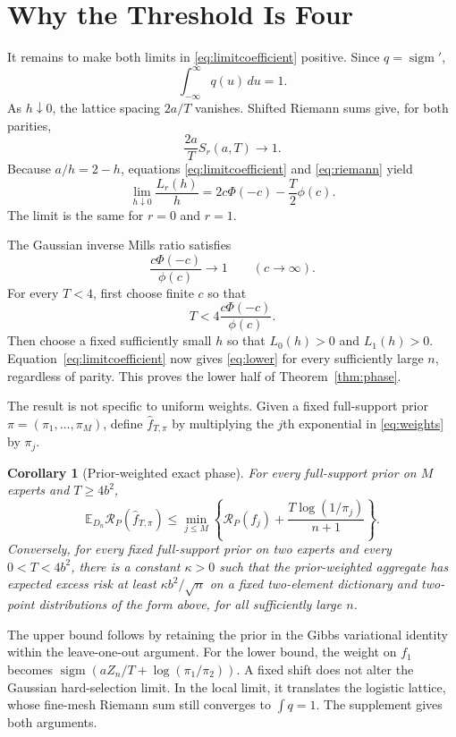 \documentclass[twoside]{article}
\newtheorem{corollary}[theorem]{Corollary}
\newcommand{\E}{\mathbb E}
\newcommand{\R}{\mathcal R}
\newcommand{\1}{\mathbf 1}
\newcommand{\sigm}{\operatorname{sigm}}
\begin{document}
\section{Why the Threshold Is Four}

It remains to make both limits in \eqref{eq:limitcoefficient} positive. Since $q=\sigm'$, \[ \int_{-\infty}^{\infty}q(u)\,du=1. \] As $h\downarrow0$, the lattice spacing $2a/T$ vanishes. Shifted Riemann sums give, for both parities,
\begin{equation}
\frac{2a}{T}S_r(a,T)\longrightarrow1.
\label{eq:riemann}
\end{equation}
Because $a/h=2-h$, equations \eqref{eq:limitcoefficient} and \eqref{eq:riemann} yield
\begin{equation}
\lim_{h\downarrow0}\frac{L_r(h)}h
=2c\Phi(-c)-\frac{T}{2}\phi(c).
\label{eq:coefficientlimit}
\end{equation}
The limit is the same for $r=0$ and $r=1$.

The Gaussian inverse Mills ratio satisfies
\begin{equation}
\frac{c\Phi(-c)}{\phi(c)}\longrightarrow1
\qquad(c\to\infty).
\label{eq:mills}
\end{equation}
For every $T<4$, first choose finite $c$ so that \[ T<4\frac{c\Phi(-c)}{\phi(c)}. \] Then choose a fixed sufficiently small $h$ so that $L_0(h)>0$ and $L_1(h)>0$. Equation~\eqref{eq:limitcoefficient} now gives \eqref{eq:lower} for every sufficiently large $n$, regardless of parity. This proves the lower half of Theorem~\ref{thm:phase}.

The result is not specific to uniform weights. Given a fixed full-support prior $\pi=(\pi_1,\ldots,\pi_M)$, define $\widehat f_{T,\pi}$ by multiplying the $j$th exponential in \eqref{eq:weights} by $\pi_j$.

\begin{corollary}[Prior-weighted exact phase]
\label{cor:prior}
For every full-support prior on $M$ experts and $T\geq4b^2$, \[ \E_{D_n}\R_P(\widehat f_{T,\pi}) \leq\min_{j\leq M}\left\{\R_P(f_j)+\frac{T\log(1/\pi_j)}{n+1}\right\}. \] Conversely, for every fixed full-support prior on two experts and every $0<T<4b^2$, there is a constant $\kappa>0$ such that the prior-weighted aggregate has expected excess risk at least $\kappa b^2/\sqrt n$ on a fixed two-element dictionary and two-point distributions of the form above, for all sufficiently large $n$.
\end{corollary}

The upper bound follows by retaining the prior in the Gibbs variational identity within the leave-one-out argument. For the lower bound, the weight on $f_1$ becomes $\sigm(aZ_n/T+\log(\pi_1/\pi_2))$. A fixed shift does not alter the Gaussian hard-selection limit. In the local limit, it translates the logistic lattice, whose fine-mesh Riemann sum still converges to $\int q=1$. The supplement gives both arguments.
\end{document}
